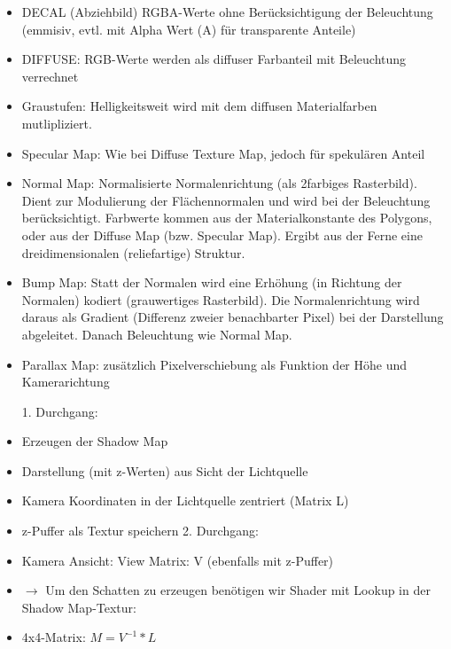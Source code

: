 \documentclass[10pt,landscape]{article}
\makeatletter
\renewcommand{\subsection}{\@startsection{subsection}{2}{0mm}%
                                {-1explus -.5ex minus -.2ex}%
                                {0.5ex plus .2ex}%
                                {\normalfont\normalsize\bfseries}}
\makeatother
\begin{document}
\begin{multicols}{3}
{\begin{itemize}
  \item DECAL (Abziehbild) RGBA-Werte ohne Berücksichtigung der Beleuchtung (emmisiv, evtl. mit Alpha Wert (A) für transparente Anteile)
  \item DIFFUSE: RGB-Werte werden als diffuser Farbanteil mit Beleuchtung verrechnet
  \item Graustufen: Helligkeitsweit wird mit dem diffusen Materialfarben mutlipliziert.
  \item Specular Map: Wie bei Diffuse Texture Map, jedoch für spekulären Anteil
  \item Normal Map: Normalisierte Normalenrichtung (als 2farbiges Rasterbild). Dient zur Modulierung der Flächennormalen und wird bei der Beleuchtung berücksichtigt. Farbwerte kommen aus der Materialkonstante des Polygons, oder aus der Diffuse Map (bzw. Specular Map). Ergibt aus der Ferne eine dreidimensionalen (reliefartige) Struktur.
  \item Bump Map: Statt der Normalen wird eine Erhöhung (in Richtung der Normalen) kodiert (grauwertiges Rasterbild). Die Normalenrichtung wird daraus als Gradient (Differenz zweier benachbarter Pixel) bei der Darstellung abgeleitet. Danach Beleuchtung wie Normal Map.
  \item Parallax Map: zusätzlich Pixelverschiebung als Funktion der Höhe und Kamerarichtung
  
  1. Durchgang: 
  \item Erzeugen der Shadow Map
  \item Darstellung (mit z-Werten) aus Sicht der Lichtquelle
  \item Kamera Koordinaten in der Lichtquelle zentriert (Matrix L)
  \item z-Puffer als Textur speichern
  2. Durchgang:
  \item Kamera Ansicht: View Matrix: V (ebenfalls mit z-Puffer)
  \item $\rightarrow$ Um den Schatten zu erzeugen benötigen wir Shader mit Lookup in der Shadow Map-Textur:
  \item 4x4-Matrix: $M = V^{-1}*L$
  
  

\end{itemize}}
\end{multicols}
\end{document}
